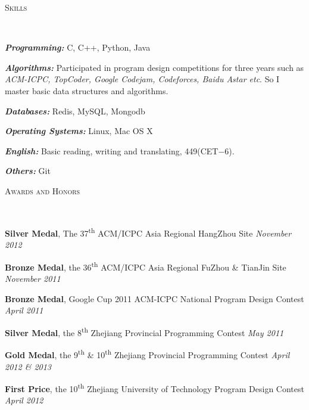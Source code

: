﻿\documentclass[9pt]{article}
\newenvironment{changemargin}[2]{%
  \begin{list}{}{%
    \setlength{\topsep}{0pt}%
    \setlength{\leftmargin}{#1}%
    \setlength{\rightmargin}{#2}%
    \setlength{\listparindent}{\parindent}%
    \setlength{\itemindent}{\parindent}%
    \setlength{\parsep}{\parskip}%
  }%
  \item[]}{\end{list}
}
\newcommand{\lineover}{
	\begin{changemargin}{-0.05in}{-0.05in}
		\vspace*{-8pt}
		\hrulefill \\
		\vspace*{-2pt}
	\end{changemargin}
}
\newcommand{\header}[1]{
	\begin{changemargin}{-0.5in}{-0.5in}
		\scshape{#1}\\
  	\lineover
	\end{changemargin}
}
\newenvironment{body} {
	\vspace*{-16pt}
	\begin{changemargin}{-0.25in}{-0.5in}
  }	
	{\end{changemargin}
}
\newcommand\nth{\textsuperscript{th}} %
\begin{document}
\smallskip


\header{Skills}

\begin{body}
	\vspace{14pt}
	\emph{\textbf{Programming:}}{} C, C++, Python, Java \\
	\medskip

    \emph{\textbf{Algorithms:}}{} Participated in program design competitions for three years such as \emph{ACM-ICPC,
TopCoder, Google Codejam, Codeforces, Baidu Astar etc}. So I master basic data structures and algorithms.\\
    \medskip

    \emph{\textbf{Databases:}}{} Redis, MySQL, Mongodb \\
    \medskip

    \emph{\textbf{Operating Systems:}}{} Linux, Mac OS X \\
    \medskip

    \emph{\textbf{English:}}{} Basic reading, writing and translating, 449(CET$-$6).\\
    \medskip

    \emph{\textbf{Others:}}{} Git

\end{body}

\smallskip

\header{Awards and Honors}

\begin{body}
	\vspace{14pt}

	\textbf{Silver Medal}, The 37\nth{} ACM/ICPC Asia Regional HangZhou Site \hfill{} \emph{November 2012}\\
	\smallskip

	\textbf{Bronze Medal}, the 36\nth{} ACM/ICPC Asia Regional FuZhou \& TianJin Site \hfill{} \emph{November 2011}\\
	\smallskip

	\textbf{Bronze Medal}, Google Cup 2011 ACM-ICPC National Program Design Contest \hfill{} \emph{April 2011}\\
	\smallskip

	\textbf{Silver Medal}, the 8\nth{} Zhejiang Provincial Programming Contest \hfill{} \emph{May 2011}\\
	\smallskip

	\textbf{Gold Medal}, the 9\nth{} \& 10\nth{} Zhejiang Provincial Programming Contest \hfill{} \emph{April 2012 \& 2013}\\
	\smallskip

	\textbf{First Price}, the 10\nth{} Zhejiang University of Technology Program Design Contest \hfill{} \emph{April 2012}\\
\end{body}
\end{document}
